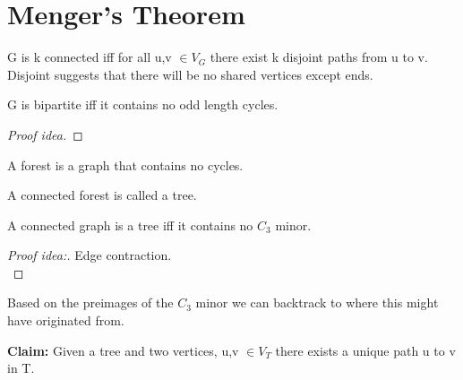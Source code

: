 \documentclass{article}
\begin{document}

\section{Menger's Theorem}
\begin{definition}
G is k connected iff for all u,v $\in V_{G}$ there exist k disjoint paths from u to v.\\
Disjoint suggests that there will be no shared vertices except ends.


\end{definition}
\begin{theorem}
    G is bipartite iff it contains no odd length cycles.
\end{theorem}
\begin{proof}[Proof idea]
  
\end{proof}
  
\begin{definition}
    A forest is a graph that contains no cycles.
\end{definition}
\begin{definition}
    A connected forest is called a tree.
\end{definition}
\begin{theorem}
    A connected graph is a tree iff it contains no {$C_3$} minor.
\end{theorem}
\begin{proof}[Proof idea:]
    Edge contraction. \\
    
\end{proof}
Based on the preimages of the {$C_3$} minor we can backtrack to where this might have originated from.

\begin{text}
{\textbf{Claim:} Given a tree and two vertices, u,v $\in V_{T}$ there exists a unique path u to v in T.}   
\end{text}
\end{document}
